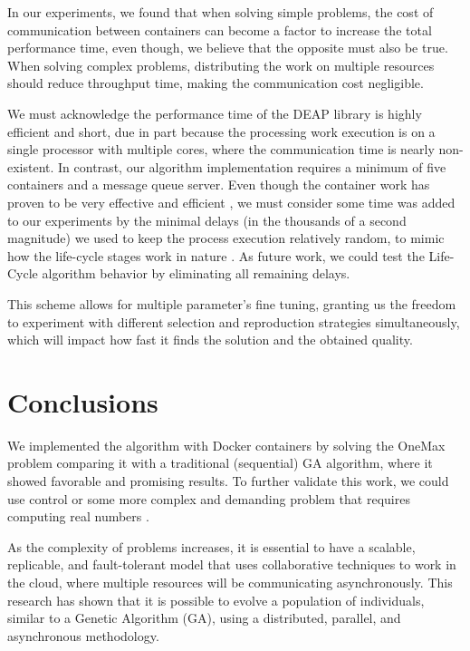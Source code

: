 \documentclass[graybox]{svmult}
\begin{document}
In our experiments, we found that when solving simple problems, the cost of
communication between containers can become a factor to increase the total
performance time, even though, we believe that the opposite must also be true.
When solving complex problems, distributing the work on multiple resources
should reduce throughput time, making the communication cost negligible.

We must acknowledge the performance time of the DEAP library
\cite{fortin2012deap} is highly efficient and short, due in part because the
processing work execution is on a single processor with multiple cores, where
the communication time is nearly non-existent. In contrast, our algorithm
implementation requires a minimum of five containers and a message queue
server. Even though the container work has proven to be very effective and
efficient \cite{merelo2016performance,valdez2021container}, we must consider
some time was added to our experiments by the minimal delays (in the thousands
of a second magnitude) we used to keep the process execution relatively random,
to mimic how the life-cycle stages work in nature \cite{read1968system}. As
future work, we could test the Life-Cycle algorithm behavior by eliminating all
remaining delays.

This scheme allows for multiple parameter's fine tuning, granting us the
freedom to experiment with different selection and reproduction strategies
simultaneously, which will impact how fast it finds the solution and the
obtained quality.


\section{Conclusions}
\label{section.conclusions}

We implemented the algorithm with Docker containers by solving the OneMax
problem comparing it with a traditional (sequential) GA algorithm, where it
showed favorable and promising results. To further validate this work, we could
use control or some more complex and demanding problem that requires computing
real numbers \cite{stanley2002evolving,miikkulainen2019evolving}.

As the complexity of problems increases, it is essential to have a scalable,
replicable, and fault-tolerant model that uses collaborative techniques to work
in the cloud, where multiple resources will be communicating asynchronously.
This research has shown that it is possible to evolve a population of
individuals, similar to a Genetic Algorithm (GA), using a distributed,
parallel, and asynchronous methodology.
\end{document}
